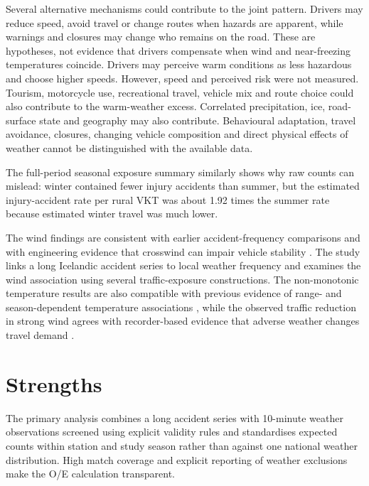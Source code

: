 

Several alternative mechanisms could contribute to the joint pattern. Drivers may reduce speed, avoid travel or change routes when hazards are apparent, while warnings and closures may change who remains on the road. These are hypotheses, not evidence that drivers compensate when wind and near-freezing temperatures coincide. Drivers may perceive warm conditions as less hazardous and choose higher speeds. However, speed and perceived risk were not measured. Tourism, motorcycle use, recreational travel, vehicle mix and route choice could also contribute to the warm-weather excess. Correlated precipitation, ice, road-surface state and geography may also contribute. Behavioural adaptation, travel avoidance, closures, changing vehicle composition and direct physical effects of weather cannot be distinguished with the available data.

The full-period seasonal exposure summary similarly shows why raw counts can mislead: winter contained fewer injury accidents than summer, but the estimated injury-accident rate per rural VKT was about 1.92 times the summer rate because estimated winter travel was much lower.

The wind findings are consistent with earlier accident-frequency comparisons
\citep{edwards1994} and with engineering evidence that crosswind can impair
vehicle stability \citep{baker1986,baker1994risk}. The study links a long Icelandic accident series to local weather frequency
and examines the wind association using several traffic-exposure
constructions. The non-monotonic
temperature results are also compatible with
previous evidence of range- and season-dependent temperature associations
\citep{lee2014,zhan2020}, while the observed traffic reduction in strong wind
agrees with recorder-based evidence that adverse weather changes travel demand
\citep{sathiaraj2018}.

\section{Strengths}

The primary analysis combines a long accident series with 10-minute weather observations screened using explicit validity rules and standardises expected counts within station
and study season rather than against one national weather distribution. High
match coverage and explicit reporting of weather exclusions make the O/E
calculation transparent.

